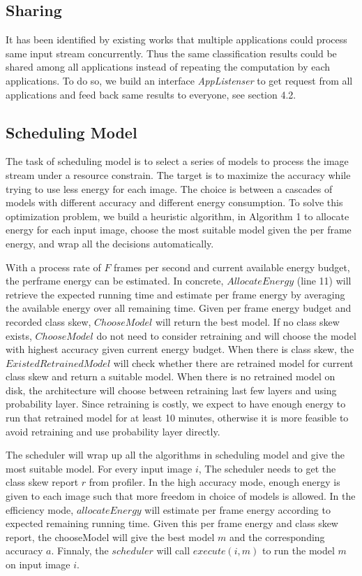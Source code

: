 \documentclass[pageno]{jpaper}
\begin{document}
\subsection{Sharing}
It has been identified by existing works that multiple applications could process same input stream concurrently. Thus the same classification results could be shared among all applications instead of repeating the computation by each applications. To do so, we build an interface \textit{AppListenser} to get request from all applications and feed back same results to everyone, see section 4.2.


\subsection{Scheduling Model}
The task of scheduling model is to select a series of models to process the image stream under a resource constrain. The target is to maximize the accuracy while trying to use less energy for each image. The choice is between a cascades of models with different accuracy and different energy consumption. To solve this optimization problem, we build a heuristic algorithm, in Algorithm 1 to allocate energy for each input image, choose the most suitable model given the per frame energy, and wrap all the decisions automatically.

With a process rate of $F$ frames per second and current available energy budget, the perframe energy can be estimated. In concrete, $AllocateEnergy$ (line 11) will retrieve the expected running time and estimate per frame energy by averaging the available energy over all remaining time. Given per frame energy budget and recorded class skew, $ChooseModel$ will return the best model. If no class skew exists, $ChooseModel$ do not need to consider retraining and will choose the model with highest accuracy given current energy budget. When there is class skew, the $ExistedRetrainedModel$ will check whether there are retrained model for current class skew and return a suitable model. When there is no retrained model on disk, the architecture will choose between retraining last few layers and using probability layer. Since retraining is costly, we expect to have enough energy to run that retrained model for at least 10 minutes, otherwise it is more feasible to avoid retraining and use probability layer directly.

The scheduler will wrap up all the algorithms in scheduling model and give the most suitable model. For every input image $i$, The scheduler needs to get the class skew report $r$ from profiler. In the high accuracy mode, enough energy is given to each image such that more freedom in choice of models is allowed. In the efficiency mode, $allocateEnergy$ will estimate per frame energy according to expected remaining running time. Given this per frame energy and class skew report, the chooseModel will give the best model $m$ and the corresponding accuracy $a$. Finnaly, the $scheduler$ will call $execute(i,m)$ to run the model $m$ on input image $i$.
\end{document}
